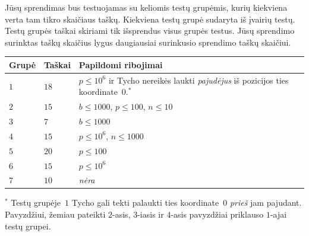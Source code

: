 Jūsų sprendimas bus testuojamas su keliomis testų grupėmis, kurių kiekviena verta tam tikro skaičiaus taškų.
Kiekviena testų grupė sudaryta iš įvairių testų.
Testų grupės taškai skiriami tik išsprendus visus grupės testus.
Jūsų sprendimo surinktas taškų skaičius lygus daugiausiai surinkusio sprendimo taškų skaičiui.

\medskip
\begin{tabular}{lll}
Grupė & Taškai & Papildomi ribojimai \\\hline
  $1$ & $18$  & $p\leq 10^6$ ir Tycho nereikės laukti \emph{pajudėjus} iš pozicijos ties koordinate~$0$.$^*$ \\ %
  $2$ & $15$  & $b\leq 1000$, $p\leq 100$, $n\leq 10$ \\
  $3$ & $7$  & $b\leq 1000$ \\
  $4$ & $15$ & $p\leq 10^6$, $n\leq 1000$\\
  $5$ & $20$ & $p\leq 100$\\
  $6$ & $15$ & $p\leq 10^6$\\
  $7$ & $10$ & \emph{nėra}
\end{tabular}

\medskip
\noindent $^*$ Testų grupėje~$1$ Tycho gali tekti palaukti ties koordinate~$0$ \emph{prieš} jam pajudant.
Pavyzdžiui, žemiau pateikti $2$-asis, $3$-iasis ir $4$-asis pavyzdžiai priklauso $1$-ajai testų grupei.
